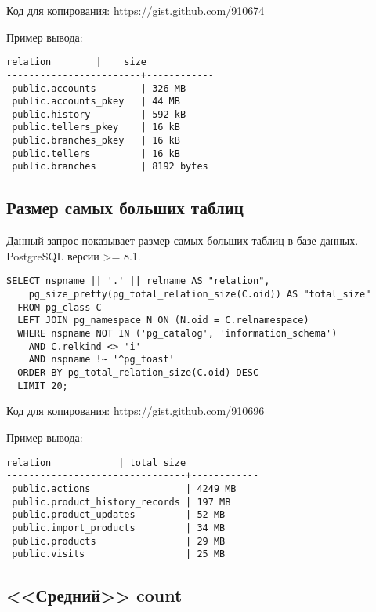 Код для копирования: https://gist.github.com/910674

Пример вывода:
\begin{lstlisting}[label=lst:snippets2,caption=Поиск самых больших объектов в БД. Пример вывод]
        relation        |    size    
------------------------+------------
 public.accounts        | 326 MB
 public.accounts_pkey   | 44 MB
 public.history         | 592 kB
 public.tellers_pkey    | 16 kB
 public.branches_pkey   | 16 kB
 public.tellers         | 16 kB
 public.branches        | 8192 bytes
\end{lstlisting}

\subsection{Размер самых больших таблиц}

\begin{framed}
Данный запрос показывает размер самых больших таблиц в базе данных. PostgreSQL версии >= 8.1.
\end{framed}

\begin{lstlisting}[label=lst:snippets3,caption=Размер самых больших таблиц. SQL запрос]
SELECT nspname || '.' || relname AS "relation",
    pg_size_pretty(pg_total_relation_size(C.oid)) AS "total_size"
  FROM pg_class C
  LEFT JOIN pg_namespace N ON (N.oid = C.relnamespace)
  WHERE nspname NOT IN ('pg_catalog', 'information_schema')
    AND C.relkind <> 'i'
    AND nspname !~ '^pg_toast'
  ORDER BY pg_total_relation_size(C.oid) DESC
  LIMIT 20;
\end{lstlisting}

Код для копирования: https://gist.github.com/910696

Пример вывода:
\begin{lstlisting}[label=lst:snippets4,caption=Размер самых больших таблиц. Пример вывод]
            relation            | total_size 
--------------------------------+------------
 public.actions                 | 4249 MB
 public.product_history_records | 197 MB
 public.product_updates         | 52 MB
 public.import_products         | 34 MB
 public.products                | 29 MB
 public.visits                  | 25 MB
\end{lstlisting}

\subsection{<<Средний>> count}

